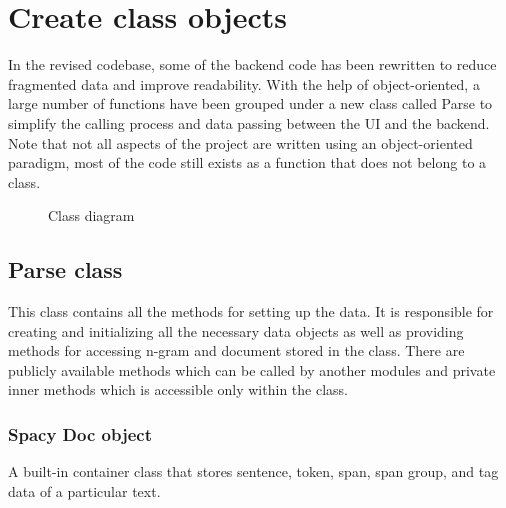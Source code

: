 \documentclass[12pt,oneside,openright,a4paper]{cpe-english-project}
\begin{document}
\section{Create class objects}
In the revised codebase, some of the backend code has been rewritten to reduce fragmented data and improve readability. With the help of object-oriented, a large number of functions have been grouped under a new class called Parse to simplify the calling process and data passing between the UI and the backend. Note that not all aspects of the project are written using an object-oriented paradigm, most of the code still exists as a function that does not belong to a class. 
\begin{figure}[!h]\centering
\setlength{\fboxrule}{0.2mm} %
\setlength{\fboxsep}{1cm}
\caption{Class diagram}\label{fig:class diagram}
\end{figure}
\subsection{ Parse class}
This class contains all the methods for setting up the data. It is responsible for creating and initializing all the necessary data objects as well as providing methods for accessing n-gram and document stored in the class. There are publicly available methods which can be called by another modules and private inner methods which is accessible only within the class.
\subsubsection{Spacy Doc object }
A built-in container class that stores sentence, token, span, span group, and tag data of a particular text. 
\end{document}
